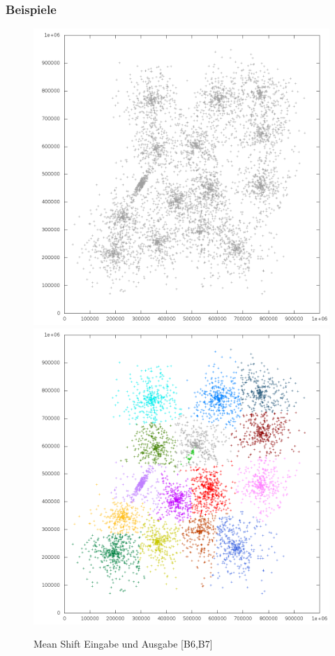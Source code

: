 \documentclass[10pt,utf8]{beamer}
\begin{document}
\begin{frame}
	\frametitle{Beispiele}
	\centering
	\begin{figure}[p!]
		\vspace{-10pt}
		\hspace{-25pt}
		\includegraphics[scale=0.23, keepaspectratio]{../output/pics/s3_black.png}
		\includegraphics[scale=0.23, keepaspectratio]{../output/pics/s3_colored.png}
		\caption{Mean Shift Eingabe und Ausgabe [B6,B7]}
	\end{figure}
\end{frame}
\end{document}

